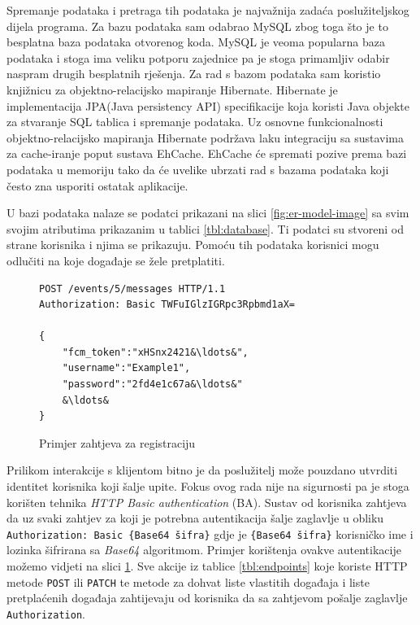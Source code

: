 \documentclass[times, utf8, zavrsni]{fer}
\begin{document}
{Spremanje podataka i pretraga tih podataka je najvažnija zadaća poslužiteljskog dijela programa. Za bazu podataka sam odabrao MySQL zbog toga što je to besplatna baza podataka otvorenog koda. MySQL je veoma popularna baza podataka i stoga ima veliku potporu zajednice pa je stoga primamljiv odabir naspram drugih besplatnih rješenja. Za rad s bazom podataka sam koristio knjižnicu za objektno-relacijsko mapiranje Hibernate. Hibernate je implementacija JPA(Java persistency API) specifikacije koja koristi Java objekte za stvaranje SQL tablica i spremanje podataka. Uz osnovne funkcionalnosti objektno-relacijsko mapiranja Hibernate podržava laku integraciju sa sustavima za cache-iranje poput sustava EhCache. EhCache će spremati pozive prema bazi podataka u memoriju tako da će uvelike ubrzati rad s bazama podataka koji često zna usporiti ostatak aplikacije.

U bazi podataka nalaze se podatci prikazani na slici \ref{fig:er-model-image} sa svim svojim atributima prikazanim u tablici \ref{tbl:database}. Ti podatci su stvoreni od strane korisnika i njima se prikazuju. Pomoću tih podataka korisnici mogu odlučiti na koje događaje se žele pretplatiti.

\begin{figure}[htb]
\begin{lstlisting}
POST /events/5/messages HTTP/1.1
Authorization: Basic TWFuIGlzIGRpc3Rpbmd1aX=

{
	"fcm_token":"xHSnx2421&\ldots&",
	"username":"Example1",
	"password":"2fd4e1c67a&\ldots&"
	&\ldots&
}
\end{lstlisting}
\caption{Primjer zahtjeva za registraciju}
\label{lst:register-request}
\end{figure}

Prilikom interakcije s klijentom bitno je da poslužitelj može pouzdano utvrditi identitet korisnika koji šalje upite. Fokus ovog rada nije na sigurnosti pa je stoga korišten tehnika {\em HTTP Basic authentication} (BA). Sustav od korisnika zahtjeva da uz svaki zahtjev za koji je potrebna autentikacija šalje zaglavlje u obliku {\tt Authorization: Basic \{Base64 šifra\}} gdje je {\tt \{Base64 šifra\}} korisničko ime i lozinka šifrirana sa {\em Base64} algoritmom. Primjer korištenja ovakve autentikacije možemo vidjeti na slici \ref{lst:register-request}. Sve akcije iz tablice \ref{tbl:endpoints} koje koriste HTTP metode {\tt POST} ili {\tt PATCH} te metode za dohvat liste vlastitih događaja i liste pretplaćenih događaja zahtijevaju od korisnika da sa zahtjevom pošalje zaglavlje {\tt Authorization}.

}
\end{document}
